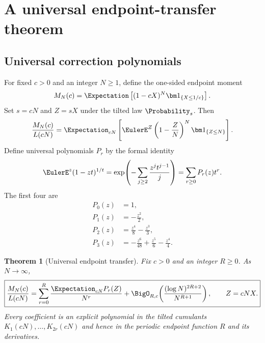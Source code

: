 \documentclass[11pt]{article}
\numberwithin{equation}{section}
\newtheorem{theorem}{Theorem}[section]
\theoremstyle{definition}
\theoremstyle{remark}
\begin{document}
\section{A universal endpoint-transfer theorem}

\subsection{Universal correction polynomials}

For fixed $c>0$ and an integer $N\ge1$, define the one-sided endpoint moment
\begin{equation}\label{p5:eq:MNc}
 M_N(c)=\Expectation\left[(1-cX)^N\bm1_{\{X\le1/c\}}\right].
\end{equation}
Set $s=cN$ and $Z=sX$ under the tilted law $\Probability_s$.  Then
\begin{equation}\label{p5:eq:MN-tilt-exact}
 \frac{M_N(c)}{L(cN)}
 =\Expectation_{cN}\left[\EulerE^Z\left(1-\frac ZN\right)^N
 \bm1_{\{Z\le N\}}\right].
\end{equation}
Define universal polynomials $P_r$ by the formal identity
\begin{equation}\label{p5:eq:P-polynomials-def}
 \EulerE^z(1-zt)^{1/t}
 =\exp\!\left(-\sum_{j\ge2}\frac{z^jt^{j-1}}j\right)
 =\sum_{r\ge0}P_r(z)t^r.
\end{equation}
The first four are
\begin{align}
 P_0(z)&=1,\nonumber\\
 P_1(z)&=-\frac{z^2}{2},\nonumber\\
 P_2(z)&=\frac{z^4}{8}-\frac{z^3}{3},\label{p5:eq:P-first}\\
 P_3(z)&=-\frac{z^6}{48}+\frac{z^5}{6}-\frac{z^4}{4}.\nonumber
\end{align}

\begin{theorem}[Universal endpoint transfer]\label{p5:thm:endpoint-transfer}
Fix $c>0$ and an integer $R\ge0$.  As $N\to\infty$,
\begin{equation}\label{p5:eq:endpoint-transfer}
 \boxed{
 \frac{M_N(c)}{L(cN)}=
 \sum_{r=0}^{R}\frac{\Expectation_{cN}P_r(Z)}{N^r}
 +\BigO_{R,c}\!\left(
 \frac{(\log N)^{2R+2}}{N^{R+1}}\right),
 \qquad Z=cNX.}
\end{equation}
Every coefficient is an explicit polynomial in the tilted cumulants
$K_1(cN),\dots,K_{2r}(cN)$ and hence in the periodic endpoint function $R$ and
its derivatives.
\end{theorem}
\end{document}
